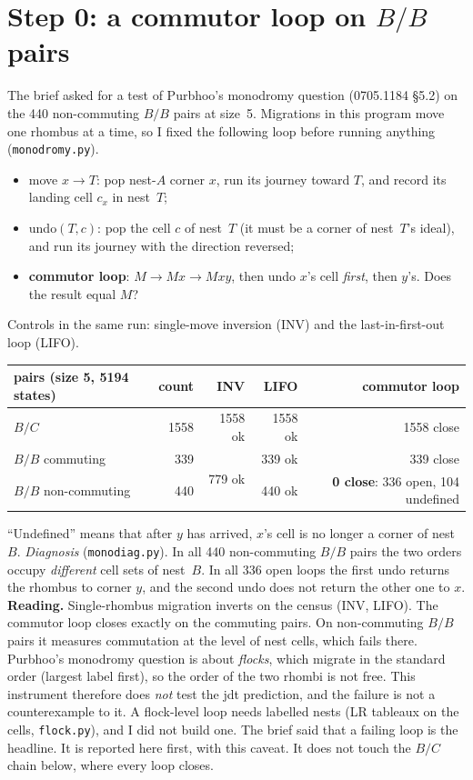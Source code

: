 \documentclass[11pt]{article}
\theoremstyle{definition}\newtheorem{definition}[theorem]{Definition}\newtheorem{remark}[theorem]{Remark}
\begin{document}
\section{Step 0: a commutor loop on $B/B$ pairs}\label{sec:step0}
The brief asked for a test of Purbhoo's monodromy question (0705.1184 \S5.2) on the 440 non-commuting $B/B$ pairs at size~5. Migrations in this program move one rhombus at a time, so I fixed the following loop before running anything (\texttt{monodromy.py}).
\begin{itemize}
\item move $x\to T$: pop nest-$A$ corner $x$, run its journey toward $T$, and record its landing cell $c_x$ in nest~$T$;
\item undo$(T,c)$: pop the cell $c$ of nest~$T$ (it must be a corner of nest~$T$'s ideal), and run its journey with the direction reversed;
\item \textbf{commutor loop}: $M\to Mx\to Mxy$, then undo $x$'s cell \emph{first}, then $y$'s. Does the result equal $M$?
\end{itemize}
Controls in the same run: single-move inversion (INV) and the last-in-first-out loop (LIFO).
\begin{center}\small\begin{tabular}{lrrrr}\toprule
pairs (size 5, 5194 states) & count & INV & LIFO & commutor loop\\\midrule
$B/C$ & 1558 & 1558 ok & 1558 ok & 1558 close\\
$B/B$ commuting & 339 & \multirow{2}{*}{779 ok} & 339 ok & 339 close\\
$B/B$ non-commuting & 440 & & 440 ok & \textbf{0 close}: 336 open, 104 undefined\\\bottomrule
\end{tabular}\end{center}
``Undefined'' means that after $y$ has arrived, $x$'s cell is no longer a corner of nest~$B$. \emph{Diagnosis} (\texttt{monodiag.py}). In all 440 non-commuting $B/B$ pairs the two orders occupy \emph{different} cell sets of nest~$B$. In all 336 open loops the first undo returns the rhombus to corner $y$, and the second undo does not return the other one to $x$.
\textbf{Reading.} Single-rhombus migration inverts on the census (INV, LIFO). The commutor loop closes exactly on the commuting pairs. On non-commuting $B/B$ pairs it measures commutation at the level of nest cells, which fails there. Purbhoo's monodromy question is about \emph{flocks}, which migrate in the standard order (largest label first), so the order of the two rhombi is not free. This instrument therefore does \emph{not} test the jdt prediction, and the failure is not a counterexample to it. A flock-level loop needs labelled nests (LR tableaux on the cells, \texttt{flock.py}), and I did not build one. The brief said that a failing loop is the headline. It is reported here first, with this caveat. It does not touch the $B/C$ chain below, where every loop closes.
\end{document}
